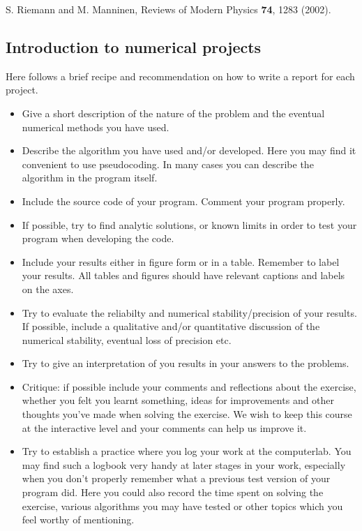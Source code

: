 \documentclass[%
oneside,                 %
final,                   %
10pt]{article}
\begin{document}
\noindent
\item S. Riemann and M. Manninen, Reviews of Modern Physics \textbf{74}, 1283 (2002). 

\subsection*{Introduction to numerical projects}

Here follows a brief recipe and recommendation on how to write a report for each
project.

\begin{itemize}
  \item Give a short description of the nature of the problem and the eventual  numerical methods you have used.

  \item Describe the algorithm you have used and/or developed. Here you may find it convenient to use pseudocoding. In many cases you can describe the algorithm in the program itself.

  \item Include the source code of your program. Comment your program properly.

  \item If possible, try to find analytic solutions, or known limits in order to test your program when developing the code.

  \item Include your results either in figure form or in a table. Remember to label your results. All tables and figures should have relevant captions and labels on the axes.

  \item Try to evaluate the reliabilty and numerical stability/precision of your results. If possible, include a qualitative and/or quantitative discussion of the numerical stability, eventual loss of precision etc.

  \item Try to give an interpretation of you results in your answers to  the problems.

  \item Critique: if possible include your comments and reflections about the  exercise, whether you felt you learnt something, ideas for improvements and  other thoughts you've made when solving the exercise. We wish to keep this course at the interactive level and your comments can help us improve it.

  \item Try to establish a practice where you log your work at the  computerlab. You may find such a logbook very handy at later stages in your work, especially when you don't properly remember  what a previous test version  of your program did. Here you could also record  the time spent on solving the exercise, various algorithms you may have tested or other topics which you feel worthy of mentioning.
\end{itemize}
\end{document}
